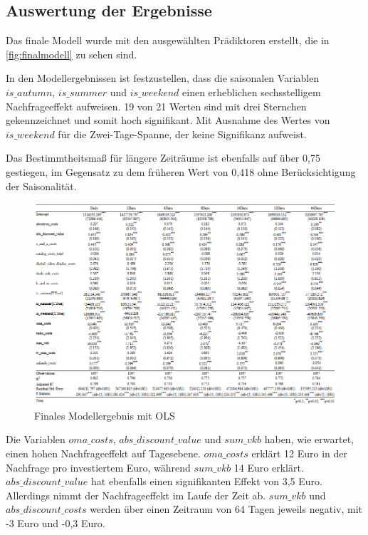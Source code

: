 \subsection{Auswertung der Ergebnisse}
\label{AuswertungDerErgebnisse}
Das finale Modell wurde mit den ausgewählten Prädiktoren erstellt, die in \autoref{fig:finalmodell} zu sehen sind. \par  
In den Modellergebnissen ist festzustellen, dass die saisonalen Variablen \(is\_autumn\), \(is\_summer\) und \(is\_weekend\) einen erheblichen sechsstelligem Nachfrageeffekt aufweisen. 19 von 21 Werten sind mit drei Sternchen gekennzeichnet und somit hoch signifikant. Mit Ausnahme des Wertes von \(is\_weekend\) für die Zwei-Tage-Spanne, der keine Signifikanz aufweist. \par  
Das Bestimmtheitsmaß für längere Zeiträume ist ebenfalls auf über 0,75 gestiegen, im Gegensatz zu dem früheren Wert von 0,418 ohne Berücksichtigung der Saisonalität.  
\begin{figure}[H]
    \centering
    \includegraphics[width=1\linewidth]{images/finalols.png}
    \caption{Finales Modellergebnis mit \ac{OLS}}
    \label{fig:finalmodell}
\end{figure}
\noindent
Die Variablen \(oma\_costs\), \(abs\_discount\_value\) und \(sum\_vkb\) haben, wie erwartet, einen hohen Nachfrageeffekt auf Tagesebene. \(oma\_costs\) erklärt 12 Euro in der Nachfrage pro investiertem Euro, während \(sum\_vkb\) 14 Euro erklärt. \(abs\_discount\_value\) hat ebenfalls einen signifikanten Effekt von 3,5 Euro. Allerdings nimmt der Nachfrageeffekt im Laufe der Zeit ab. \(sum\_vkb\) und \(abs\_discount\_costs\) werden über einen Zeitraum von 64 Tagen jeweils negativ, mit -3 Euro und -0,3 Euro.  \par
